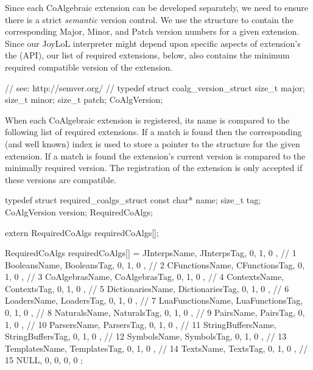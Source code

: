 Since each CoAlgebraic extension can be developed separately, we need to 
ensure there is a strict \emph{semantic} version control. We use the 
 structure to contain the corresponding Major, Minor, 
and Patch version numbers for a given extension. Since our JoyLoL 
interpreter might depend upon specific aspects of extension's the 
 (API), our list of required 
extensions, below, also contains the minimum required compatible version 
of the extension. 

\startCHeader
// see: http://semver.org/
//
typedef struct coalg_version_struct {
  size_t major;
  size_t minor;
  size_t patch;
} CoAlgVersion;
\stopCHeader

When each CoAlgebraic extension is registered, its name is compared to the 
following list of required extensions. If a match is found then the 
corresponding (and well known) index is used to store a pointer to the 
 structure for the given extension. If a match is found 
the extension's current version is compared to the minimally required 
version. The registration of the extension is only accepted if these 
versions are compatible. 

\startCHeader
typedef struct required_coalgs_struct {
  const char*  name;
  size_t       tag;
  CoAlgVersion version;
} RequiredCoAlgs;

extern RequiredCoAlgs requiredCoAlgs[];
\stopCHeader
{}

\startCCode
RequiredCoAlgs requiredCoAlgs[] = {
  { JInterpsName,      JInterpsTag,      {0, 1, 0 }}, //  1
  { BooleansName,      BooleansTag,      {0, 1, 0 }}, //  2
  { CFunctionsName,    CFunctionsTag,    {0, 1, 0 }}, //  3
  { CoAlgebrasName,    CoAlgebrasTag,    {0, 1, 0 }}, //  4
  { ContextsName,      ContextsTag,      {0, 1, 0 }}, //  5
  { DictionariesName,  DictionariesTag,  {0, 1, 0 }}, //  6
  { LoadersName,       LoadersTag,       {0, 1, 0 }}, //  7
  { LuaFunctionsName,  LuaFunctionsTag,  {0, 1, 0 }}, //  8
  { NaturalsName,      NaturalsTag,      {0, 1, 0 }}, //  9
  { PairsName,         PairsTag,         {0, 1, 0 }}, // 10
  { ParsersName,       ParsersTag,       {0, 1, 0 }}, // 11
  { StringBuffersName, StringBuffersTag, {0, 1, 0 }}, // 12
  { SymbolsName,       SymbolsTag,       {0, 1, 0 }}, // 13
  { TemplatesName,     TemplatesTag,     {0, 1, 0 }}, // 14
  { TextsName,         TextsTag,         {0, 1, 0 }}, // 15
  { NULL,              0,                {0, 0, 0 }}
};
\stopCCode


